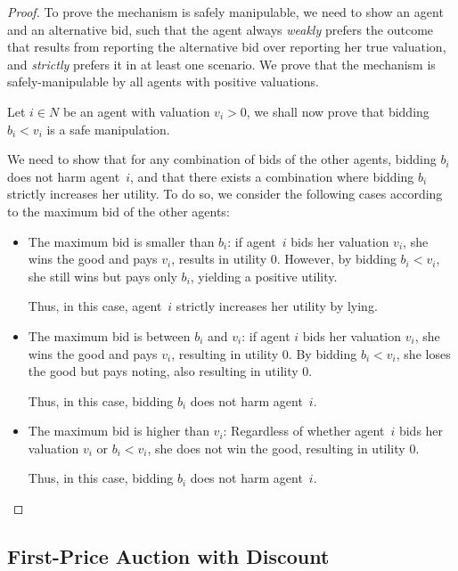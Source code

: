 \begin{proof}
To prove the mechanism is safely manipulable, we need to show an agent and an alternative bid, such that the agent always \emph{weakly} prefers the outcome that results from reporting the alternative bid over reporting her true valuation, and \emph{strictly} prefers it in at least one scenario.
We prove that the mechanism is safely-manipulable by all agents with positive valuations.
    
Let $i \in N$ be an agent with valuation $v_i > 0$, we shall now prove that bidding $b_i < v_i$ is a safe manipulation.
    
We need to show that for any combination of bids of the other agents, bidding $b_i$ does not harm agent~$i$, and that there exists a combination where bidding $b_i$ strictly increases her utility. 
    To do so, we consider the following cases according to the maximum bid of the other agents:
    \begin{itemize}
        \item The maximum bid is smaller than $b_i$: if agent~$i$ bids her valuation $v_i$, she wins the good and pays $v_i$, results in utility $0$. 
        However, by bidding $b_i < v_i$, she still wins but pays only $b_i$, yielding a positive utility. 
        
        Thus, in this case, agent~$i$ strictly increases her utility by lying.

        
        \item The maximum bid is between $b_i$ and $v_i$: if agent $i$ bids her valuation $v_i$, she wins the good and pays $v_i$, resulting in utility $0$. 
        By bidding $b_i < v_i$, she loses the good but pays noting, also resulting in utility $0$.
        
        Thus, in this case, bidding $b_i$ does not harm agent~$i$.

        \item  The maximum bid is higher than $v_i$: Regardless of whether agent~$i$ bids her valuation $v_i$ or $b_i < v_i$, she does not win the good, resulting in utility $0$.
        
        Thus, in this case, bidding $b_i$ does not harm agent~$i$.
    \end{itemize}

\end{proof}





\subsection{First-Price Auction with Discount}\label{sec:first-price-w-discount}

